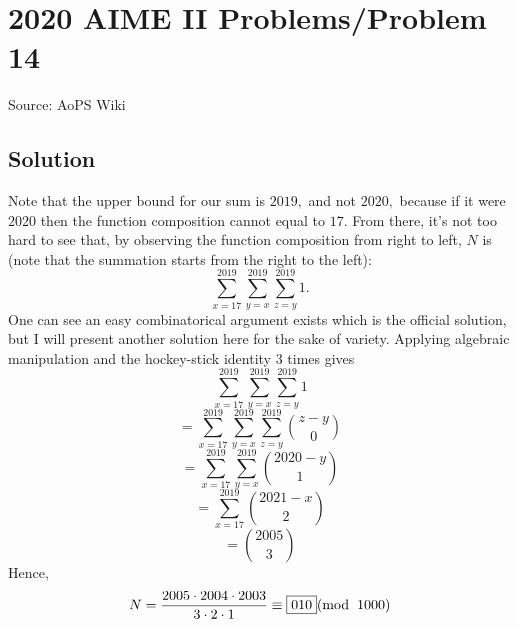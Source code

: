 \documentclass[12pt]{article}
\begin{document}
\section*{{2020 AIME II Problems/Problem 14}}
Source: AoPS Wiki

\subsection*{Solution}
Note that the upper bound for our sum is $2019,$ and not $2020,$ because if it were $2020$ then the function composition cannot equal to $17.$ From there, it's not too hard to see that, by observing the function composition from right to left, $N$ is (note that the summation starts from the right to the left): \[\sum_{x=17}^{2019} \sum_{y=x}^{2019} \sum_{z=y}^{2019} 1 .\] One can see an easy combinatorical argument exists which is the official solution, but I will present another solution here for the sake of variety. Applying algebraic manipulation and the hockey-stick identity $3$ times gives \[\sum_{x=17}^{2019} \sum_{y=x}^{2019} \sum_{z=y}^{2019} 1\] \[=\sum_{x=17}^{2019} \sum_{y=x}^{2019} \sum_{z=y}^{2019} \binom{z-y}{0}\] \[=\sum_{x=17}^{2019} \sum_{y=x}^{2019} \binom{2020-y}{1}\] \[=\sum_{x=17}^{2019} \binom{2021-x}{2}\] \[=\binom{2005}{3}\] Hence, \[N = \frac{2005 \cdot 2004 \cdot 2003}{3 \cdot 2\cdot 1} \equiv \boxed{010} (\mathrm{mod} \hskip .2cm 1000)\]
\end{document}
